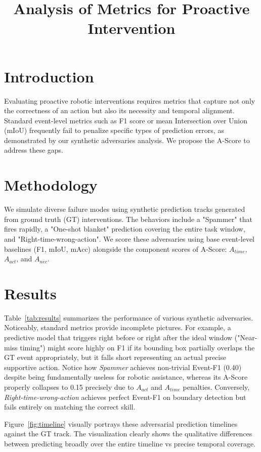 \documentclass{article}
\title{Analysis of Metrics for Proactive Intervention}
\author{}
\date{}
\begin{document}
\maketitle

\section{Introduction}
Evaluating proactive robotic interventions requires metrics that capture not only the correctness of an action but also its necessity and temporal alignment. Standard event-level metrics such as F1 score or mean Intersection over Union (mIoU) frequently fail to penalize specific types of prediction errors, as demonstrated by our synthetic adversaries analysis. We propose the A-Score to address these gaps.

\section{Methodology}
We simulate diverse failure modes using synthetic prediction tracks generated from ground truth (GT) interventions. The behaviors include a "Spammer" that fires rapidly, a "One-shot blanket" prediction covering the entire task window, and "Right-time-wrong-action". We score these adversaries using base event-level baselines (F1, mIoU, mAcc) alongside the component scores of A-Score: $A_{time}$, $A_{act}$, and $A_{nec}$.

\section{Results}
Table~\ref{tab:results} summarizes the performance of various synthetic adversaries. Noticeably, standard metrics provide incomplete pictures. For example, a predictive model that triggers right before or right after the ideal window ("Near-miss timing") might score highly on F1 if its bounding box partially overlaps the GT event appropriately, but it falls short representing an actual precise supportive action. Notice how \textit{Spammer} achieves non-trivial Event-F1 (0.40) despite being fundamentally useless for robotic assistance, whereas its A-Score properly collapses to 0.15 precisely due to $A_{act}$ and $A_{time}$ penalties. Conversely, \textit{Right-time-wrong-action} achieves perfect Event-F1 on boundary detection but fails entirely on matching the correct skill.

Figure~\ref{fig:timeline} visually portrays these adversarial prediction timelines against the GT track. The visualization clearly shows the qualitative differences between predicting broadly over the entire timeline vs precise temporal coverage.
\end{document}

